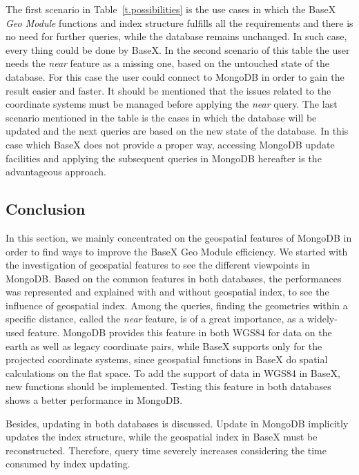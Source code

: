 \documentclass[a4paper,12pt]{article}
\begin{document}
The first scenario in Table~\ref{t.possibilities} is the use cases in which the BaseX \textit{Geo Module} functions and index structure fulfills all the requirements and there is no need for further queries, while the database remains unchanged. In such case, every thing could be done by BaseX. In the second scenario of this table the user needs the \textit{near} feature as a missing one, based on the untouched state of the database. For this case the user could connect to MongoDB in order to gain the result easier and faster. It should be mentioned that the issues related to the coordinate systems must be managed before applying the \textit{near} query. The last scenario mentioned in the table is the cases in which the database will be updated and the next queries are based on the new state of the database. In this case which BaseX does not provide a proper way, accessing MongoDB update facilities and applying the subsequent queries in MongoDB hereafter is the advantageous approach. 

\subsection{Conclusion}
\label{conc}
In this section, we mainly concentrated on the geospatial features of MongoDB in order to find ways to improve the BaseX Geo Module efficiency. We started with the investigation of geospatial features to see the different viewpoints in MongoDB. Based on the common features in both databases, the performances was represented and explained with and without geospatial index, to see the influence of geospatial index.
Among the queries, finding the geometries within a specific distance, called the \textit{near} feature, is of a great importance, as a widely-used feature. MongoDB provides this feature in both WGS84 for data on the earth as well as legacy coordinate pairs, while BaseX supports only for the projected coordinate systems, since geospatial functions in BaseX do spatial calculations on the flat space. To add the support of data in WGS84 in BaseX, new functions should be implemented. Testing this feature in both databases shows a better performance in MongoDB. 

Besides, updating in both databases is discussed. Update in MongoDB implicitly updates the index structure, while the geospatial index in BaseX must be reconstructed. Therefore, query time severely increases considering the time consumed by index updating. 
\end{document}
